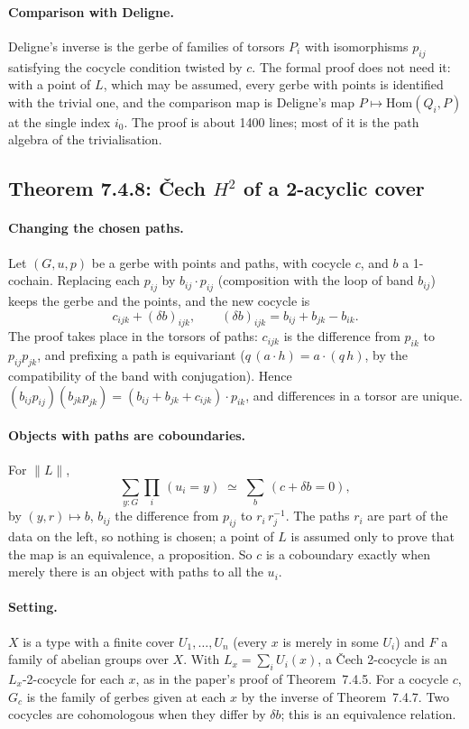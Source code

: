 \documentclass[11pt]{article}
\newcommand{\tr}[1]{\lVert #1\rVert}
\theoremstyle{remark}
\begin{document}
\paragraph{Comparison with Deligne.} Deligne's inverse is the gerbe of
families of torsors $P_i$ with isomorphisms $p_{ij}$ satisfying the
cocycle condition twisted by $c$. The formal proof does not need it:
with a point of $L$, which may be assumed, every gerbe with points is
identified with the trivial one, and the comparison map is Deligne's map
$P\mapsto\mathrm{Hom}(Q_i,P)$ at the single index $i_0$. The proof is about
1400 lines; most of it is the path algebra of the trivialisation.

\subsection*{Theorem 7.4.8: \v{C}ech $H^2$ of a 2-acyclic cover}

\paragraph{Changing the chosen paths.} Let $(G,u,p)$ be a gerbe with
points and paths, with cocycle $c$, and $b$ a 1-cochain. Replacing each
$p_{ij}$ by $b_{ij}\cdot p_{ij}$ (composition with the loop of band
$b_{ij}$) keeps the gerbe and the points, and the new cocycle is
\[
  c_{ijk}+(\delta b)_{ijk},\qquad (\delta b)_{ijk}=b_{ij}+b_{jk}-b_{ik}.
\]
The proof takes place in the torsors of paths: $c_{ijk}$ is the
difference from $p_{ik}$ to $p_{ij}p_{jk}$, and prefixing a path is
equivariant ($q\,(a\cdot h)=a\cdot(q\,h)$, by the compatibility of the
band with conjugation). Hence
$(b_{ij}p_{ij})(b_{jk}p_{jk})=(b_{ij}+b_{jk}+c_{ijk})\cdot p_{ik}$, and
differences in a torsor are unique.

\paragraph{Objects with paths are coboundaries.} For $\tr{L}$,
\[
  \textstyle\sum_{y:G}\prod_i\,(u_i=y)\;\simeq\;
  \sum_{b}\,(c+\delta b=0),
\]
by $(y,r)\mapsto b$, $b_{ij}$ the difference from $p_{ij}$ to
$r_i\,r_j^{-1}$. The paths $r_i$ are part of the data on the left, so
nothing is chosen; a point of $L$ is assumed only to prove that the map
is an equivalence, a proposition. So $c$ is a coboundary exactly when
merely there is an object with paths to all the $u_i$.

\paragraph{Setting.} $X$ is a type with a finite cover $U_1,\dots,U_n$
(every $x$ is merely in some $U_i$) and $F$ a family of abelian groups
over $X$. With $L_x=\sum_i U_i(x)$, a \v{C}ech 2-cocycle is an
$L_x$-2-cocycle for each $x$, as in the paper's proof of Theorem~7.4.5.
For a cocycle $c$, $G_c$ is the family of gerbes given at each $x$ by the
inverse of Theorem~7.4.7. Two cocycles are cohomologous when they differ
by $\delta b$; this is an equivalence relation.
\end{document}
